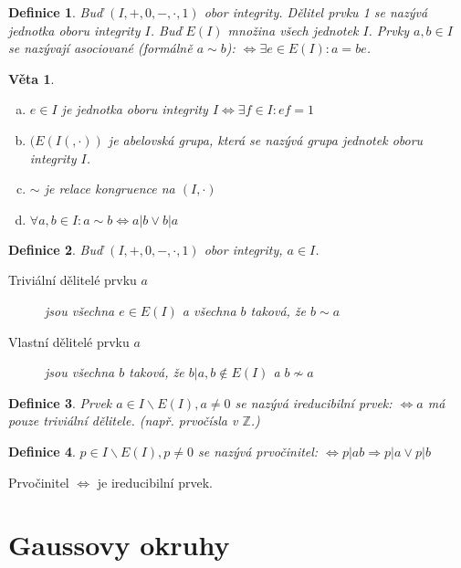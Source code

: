 \documentclass[a4paper, 11pt]{report}
\newtheorem{mydef}{Definice}[chapter]
\newtheorem{veta}{Věta}[chapter]
\begin{document}
\begin{mydef}
Buď $(I, +, 0, -, \cdot, 1)$ obor integrity. Dělitel prvku 1 se nazývá jednotka oboru integrity $I$. Buď $E(I)$ množina všech jednotek $I$. Prvky $a, b \in I$ se nazývají asociované (formálně $a \sim b$): $\Leftrightarrow \exists e \in E(I): a = be$.
\end{mydef}

\begin{veta}
\begin{enumerate}[a)]
	\item $e \in I$ je jednotka oboru integrity $I \Leftrightarrow \exists f \in I: ef = 1$
	\item $(E(I(, \cdot))$ je abelovská grupa, která se nazývá grupa jednotek oboru integrity  $I$.
	\item $\sim$ je relace kongruence na $(I, \cdot)$
	\item $\forall a, b \in I: a \sim b \Leftrightarrow a|b \lor b|a$
\end{enumerate}
\end{veta}

\begin{mydef}
Buď $(I, +, 0, -, \cdot, 1)$ obor integrity, $a \in I$.
\begin{description}
	\item[Triviální dělitelé prvku $a$] jsou všechna $e \in E(I)$ a všechna $b$ taková, že $b \sim a$
	\item[Vlastní dělitelé prvku $a$] jsou všechna $b$ taková, že $b | a, b \not\in E(I)$ a $b \not\sim a$
\end{description}
\end{mydef}

\begin{mydef}
Prvek $a \in I \backslash E(I), a \not= 0$ se nazývá ireducibilní prvek: $\Leftrightarrow a$ má pouze triviální dělitele. (např. prvočísla v $\mathbb{Z}$.)
\end{mydef}

\begin{mydef}
$p \in I \backslash E(I), p \not= 0$ se nazývá prvočinitel: $\Leftrightarrow p|ab \Rightarrow p|a \lor p|b$
\end{mydef}

Prvočinitel $\Leftrightarrow$ je ireducibilní prvek.

\section{Gaussovy okruhy}
\end{document}
